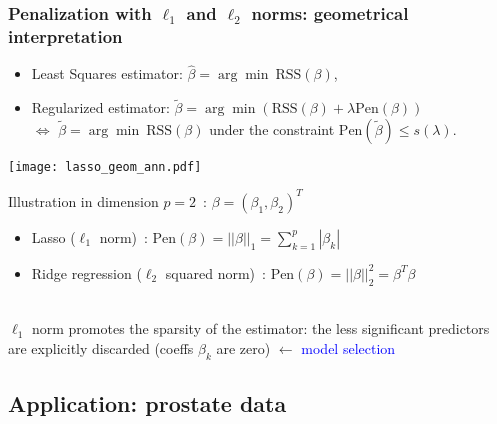 \documentclass[compress, smaller, serif, 9pt]{beamer}
\begin{document}
\begin{frame}
  \frametitle{Penalization with $\ell_1$ and $\ell_2$ norms: geometrical interpretation}
  \vspace{-2mm}
{\small
  \begin{itemize}
 \item Least Squares estimator: $\widehat{\beta}= \arg\min \ \textrm{RSS}(\beta)$,
 \item Regularized estimator: $\widetilde{\beta}= \arg\min \left( \textrm{RSS}(\beta) + \lambda \textrm{Pen}(\beta) \right)$ \\
 $\Leftrightarrow$ $\widetilde{\beta}= \arg\min \  \textrm{RSS}(\beta)$ under the constraint 
 $\textrm{Pen}\left(\widetilde{\beta}\right) \le s(\lambda)$.
\end{itemize}
}
\begin{minipage}{.55\textwidth}
\begin{center}
\texttt{[image: lasso\_geom\_ann.pdf]}
\end{center}
\end{minipage}
\begin{minipage}{.4\textwidth}
{\small
Illustration in dimension $p=2$~: $\beta=(\beta_1,\beta_2)^T$
\begin{itemize}
\scriptsize
 \item Lasso ($\ell_1$ norm)~: $\textrm{Pen}\left(\beta\right)= ||\beta||_1 = \sum_{k=1}^p |\beta_k|$
 \item Ridge regression ($\ell_2$ squared norm)~: $\textrm{Pen}\left(\beta\right)= ||\beta||_2^2= \beta^T \beta$
\end{itemize}
}
\end{minipage}\\
{\small 
 $\ell_1$ norm promotes the sparsity of the estimator: the less significant predictors are 
 explicitly discarded (coeffs $\beta_k$ are zero)  $\leftarrow$ 
 \textcolor{blue}{model selection}}

\end{frame}


\subsection{Application: prostate data}
\end{document}
